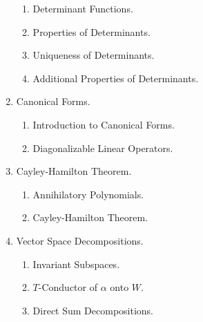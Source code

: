 \begin{enumerate}[label=Topic \arabic*]
\begin{enumerate}[label=Session \arabic*]
		\item Determinant Functions.
		\item Properties of Determinants.
		\item Uniqueness of Determinants.
		\item Additional Properties of Determinants.
	\end{enumerate}
	\item Canonical Forms.
	\begin{enumerate}[label=Session \arabic*]
		\item Introduction to Canonical Forms.
		\item Diagonalizable Linear Operators.
	\end{enumerate}
	\item Cayley-Hamilton Theorem.
	\begin{enumerate}[label=Session \arabic*]
		\item Annihilatory Polynomials.
		\item Cayley-Hamilton Theorem.
	\end{enumerate}
	\item Vector Space Decompositions.
	\begin{enumerate}[label=Session \arabic*]
		\item Invariant Subspaces.
		\item $T$-Conductor of $\alpha$ onto $W$.
		\item Direct Sum Decompositions.
	\end{enumerate}
\end{enumerate}

